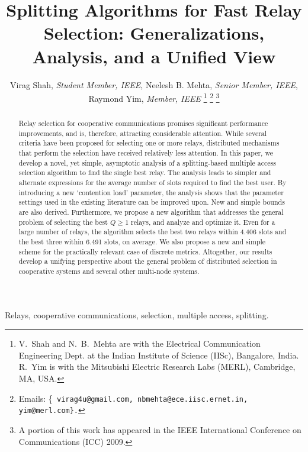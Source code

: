 \documentclass[12pt,draftcls,peerreview, onecolumn]{IEEEtran}
\begin{document}
\title{Splitting Algorithms for Fast Relay Selection: Generalizations, Analysis, and a Unified View}

\author{Virag Shah, {\it Student Member, IEEE}, Neelesh B.  Mehta, {\it Senior Member, IEEE}, Raymond Yim, {\it Member, IEEE}
\thanks{V.\ Shah and N.\ B.\ Mehta are with the Electrical
    Communication Engineering Dept. at the Indian Institute of Science
    (IISc), Bangalore, India.  R.\ Yim is with the Mitsubishi Electric
    Research Labs (MERL), Cambridge, MA, USA.}
\thanks{Emails: \{\tt
    virag4u@gmail.com, nbmehta@ece.iisc.ernet.in, yim@merl.com\}.}
\thanks{A portion of this work has appeared in the IEEE International Conference on Communications (ICC) 2009.} 
}


 \maketitle

\begin{abstract}
  
  Relay selection for cooperative communications promises significant
  performance improvements, and is, therefore, attracting considerable
  attention. While several criteria have been proposed for selecting
  one or more relays, distributed mechanisms that perform the
  selection have received relatively less attention. In this paper, we
  develop a novel, yet simple, asymptotic analysis of a
  splitting-based multiple access selection algorithm to find the
  single best relay. The analysis leads to simpler and alternate
  expressions for the average number of slots required to find the
  best user. By introducing a new `contention load' parameter, the
  analysis shows that the parameter settings used in the existing
  literature can be improved upon. New and simple bounds are also
  derived. Furthermore, we propose a new algorithm that addresses the
  general problem of selecting the best $Q \ge 1$ relays, and analyze
  and optimize it.  Even for a large number of relays, the algorithm
  selects the best two relays within 4.406 slots and the best three
  within 6.491 slots, on average. We also propose a new and simple
  scheme for the practically relevant case of discrete metrics.
  Altogether, our results develop a unifying perspective about the
  general problem of distributed selection in cooperative systems and
  several other multi-node systems.
\end{abstract}

\begin{keywords}
Relays, cooperative communications, selection, multiple access, splitting.
\end{keywords}
\end{document}
